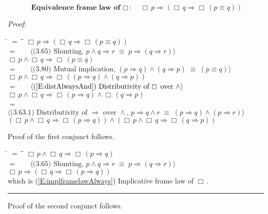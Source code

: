 \documentclass[12pt, fleqn, leqno]{article}
\newcommand{\lgap}{2pt}                             %
\newcommand{\mymathindent}{24pt}                    %
\newcommand{\equivs}{\ensuremath{\;\equiv\;}}       %
\newcommand{\impl}{\ensuremath{\Rightarrow}}        %
\newcommand{\Always}{\Box\,}
\newcommand{\myqed}{\rule[-.23ex]{1.2ex}{2.0ex}}
\newcommand{\myqedtab}{\hspace{384pt}}              %
\newcommand{\Gll} {\langle}                         %
\newcommand{\Ggg} {\rangle}                         %
\newcommand{\Hint}[1]     {\ \ \ $\Gll              \mbox{#1} \Ggg$ }   %
\begin{document}
\begin{equation}\label{E:equivframelawAlways}
\textbf{Equivalence frame law of $\Always$:}\quad \Always p \impl (\Always q \impl \Always (p \equiv q))
\end{equation}

\emph{Proof}: 
\begin{tabbing}
\hspace{\mymathindent} \= $= \;$ \= \myqedtab \= \kill
  \> \>   $\Always p \impl (\Always q \impl \Always (p \equiv q)) $\\[\lgap]
  \> $=$  \>  \Hint{(3.65) Shunting, $p\land q\impl r\equivs p\impl (q\impl r)$}\\[\lgap]
  \> \>   $\Always p \land \Always q \impl \Always (p \equiv q) $\\[\lgap]
  \> $=$  \>  \Hint{(3.80) Mutual implication, $(p\impl q) \land (q\impl p) \equivs (p\equiv q)$}\\[\lgap]
  \> \>   $\Always p \land \Always q \impl \Always ( (p \impl  q) \land (q \impl  p))$\\[\lgap]
     \> $=$  \>  \Hint{(\ref{E:distAlwaysAnd}) Distributivity of $\Always$ over $\land$}\\[\lgap]
  \> \>   $\Always p \land \Always q \impl \Always (p \impl  q) \land \Always (q \impl  p)$\\[\lgap]
  \> $=$  \>  \Hint{(3.63.1) Distributivity of $\impl$ over $\land$, $p\impl q\land r\equivs (p\impl q)\land (p\impl r)$}\\[\lgap]
  \> \>   $(\Always p \land \Always q \impl \Always( p \impl  q)) \land (\Always p \land \Always q \impl \Always (q \impl p))$
  \end{tabbing}
Proof of the first conjunct follows.
\begin{tabbing}
\hspace{\mymathindent} \= $= \;$ \= \myqedtab \= \kill
  \> \>   $\Always p \land \Always q \impl \Always( p \impl  q)$\\[\lgap]
  \> $=$  \>  \Hint{(3.65) Shunting, $p\land q\impl r\equivs p\impl (q\impl r)$}\\[\lgap]
  \> \>   $\Always p \impl ( \Always q \impl \Always( p \impl  q))$\\[\lgap]
  \> which is (\ref{E:implframelawAlways}) Implicative frame law of $\Always$. \quad \myqed
\end{tabbing}
Proof of the second conjunct follows.
\end{document}
